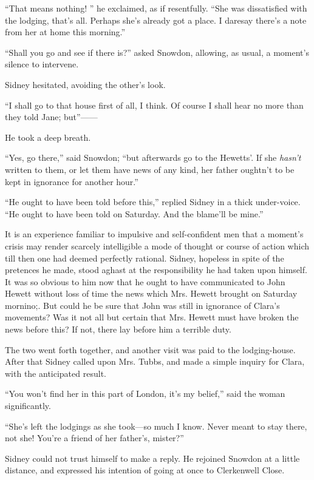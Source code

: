 ``That means nothing! '' he exclaimed, as if resentfully. ``She was
dissatisfied with the lodging, that's all. Perhaps she's already got a
place. I daresay there's a note from her at home this morning.''

``Shall you go and see if there is?'' asked Snowdon, allowing, as usual,
a moment's silence to intervene.

Sidney hesitated, avoiding the other's look.

``I shall go to that house first of all, I think. Of course I shall hear
no more than they told Jane; but''{{------}}

{\protect\hypertarget{280}{}{}}He took a deep breath.

``Yes, go there,'' said Snowdon; ``but afterwards go to the Hewetts'. If
she \emph{hasn't} written to them, or let them have news of any kind,
her father oughtn't to be kept in ignorance for another hour.''

``He ought to have been told before this,'' replied Sidney in a thick
under-voice. ``He ought to have been told on Saturday. And the blame'll
be mine.''

It is an experience familiar to impulsive and self-confident men that a
moment's crisis may render scarcely intelligible a mode of thought or
course of action which till then one had deemed perfectly rational.
Sidney, hopeless in spite of the pretences he made, stood aghast at the
responsibility he had taken upon himself. It was so obvious to him now
that he ought to have communicated to John Hewett without loss of time
the news which Mrs. Hewett brought on Saturday mornino;. But could he be
sure that John was still in ignorance of Clara's movements? Was it not
all but certain that Mrs. Hewett {\protect\hypertarget{281}{}{}}must
have broken the news before this? If not, there lay before him a
terrible duty.

The two went forth together, and another visit was paid to the
lodging-house. After that Sidney called upon Mrs. Tubbs, and made a
simple inquiry for Clara, with the anticipated result.

``You won't find her in this part of London, it's my belief,'' said the
woman significantly.

``She's left the lodgings as she took---so much I know. Never meant to
stay there, not she! You're a friend of her father's, mister?''

Sidney could not trust himself to make a reply. He rejoined Snowdon at a
little distance, and expressed his intention of going at once to
Clerkenwell Close.

